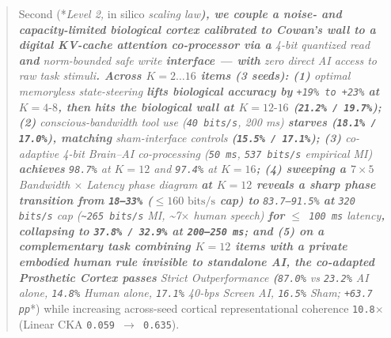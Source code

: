 \documentclass[11pt,a4paper]{article}
\begin{document}
\begin{abstract}
Second (*\emph{Level 2, }in silico\emph{ scaling law\textbf{), we couple a noise- and capacity-limited biological cortex calibrated to Cowan's wall to a digital KV-cache attention co-processor via a }4-bit quantized read\textbf{ and }norm-bounded safe write\textbf{ interface --- with }zero direct AI access to raw task stimuli\textbf{. Across $K = 2 \dots 16$ items (3 seeds): (1) }optimal memoryless state-steering\textbf{ lifts biological accuracy by }\texttt{+19\% to +23\%}\textbf{ at $K = 4\text{-}8$, then hits the biological wall at $K = 12\text{-}16$ (\texttt{21.2\% / 19.7\%}); (2) }conscious-bandwidth tool use (\texttt{40 bits/s}, 200 ms)\textbf{ starves (\texttt{18.1\% / 17.0\%}), matching }sham-interface controls\textbf{ (\texttt{15.5\% / 17.1\%}); (3) }co-adaptive 4-bit Brain--AI co-processing (\texttt{50 ms}, \texttt{537 bits/s} empirical MI)\textbf{ achieves }\texttt{98.7\%} at $K = 12$ and \texttt{97.4\%} at $K = 16$\textbf{; (4) sweeping a $7 \times 5$ }Bandwidth $\times$ Latency phase diagram\textbf{ at $K = 12$ reveals a sharp phase transition from \texttt{18--33\%} ($\le 160\text{ bits/s}$ cap) to }\texttt{83.7--91.5\%}\textbf{ at }\texttt{320 bits/s} cap (\texttt{\textasciitilde{}265 bits/s} MI, \textasciitilde{}7$\times$ human speech)\textbf{ for }\texttt{$\le$ 100 ms} latency\textbf{, collapsing to \texttt{37.8\% / 32.9\%} at \texttt{200--250 ms}; and (5) on a complementary task combining $K = 12$ items with a private embodied human rule invisible to standalone AI, the co-adapted Prosthetic Cortex passes }Strict Outperformance\textbf{ (}\texttt{87.0\%} vs \texttt{23.2\%} AI alone, \texttt{14.8\%} Human alone, \texttt{17.1\%} 40-bps Screen AI, \texttt{16.5\%} Sham; \texttt{+63.7 pp}}*) while increasing across-seed cortical representational coherence \texttt{10.8$\times$} (Linear CKA \texttt{0.059 $\to$ 0.635}).


\end{abstract}
\end{document}
